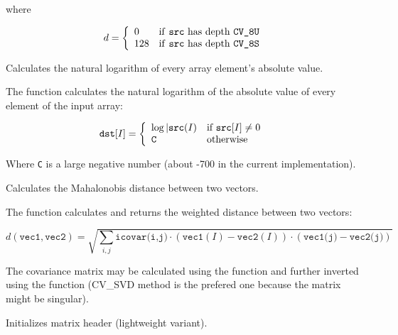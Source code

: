 where

\[
d = \left\{ \begin{array}{l l} 0 & \mbox{if \texttt{src} has depth \texttt{CV\_8U}}\\ 128 & \mbox{if \texttt{src} has depth \texttt{CV\_8S}}\\ \end{array} \right.
\]

Calculates the natural logarithm of every array element's absolute value.


\begin{description}
\end{description}

The function calculates the natural logarithm of the absolute value of every element of the input array:

\[
\texttt{dst} [I] = \left\{ \begin{array}{l l} \log{|\texttt{src}(I)} & \mbox{if $\texttt{src}[I] \ne 0$ }\\ \texttt{C} & \mbox{otherwise}\\ \end{array} \right.
\]

Where \texttt{C} is a large negative number (about -700 in the current implementation).

Calculates the Mahalonobis distance between two vectors.


\begin{description}
\end{description}


The function calculates and returns the weighted distance between two vectors:

\[
d(\texttt{vec1},\texttt{vec2})=\sqrt{\sum_{i,j}{\texttt{icovar(i,j)}\cdot(\texttt{vec1}(I)-\texttt{vec2}(I))\cdot(\texttt{vec1(j)}-\texttt{vec2(j)})}}
\]

The covariance matrix may be calculated using the  function and further inverted using the  function (CV\_SVD method is the prefered one because the matrix might be singular).


\ifC
{}
Initializes matrix header (lightweight variant).


